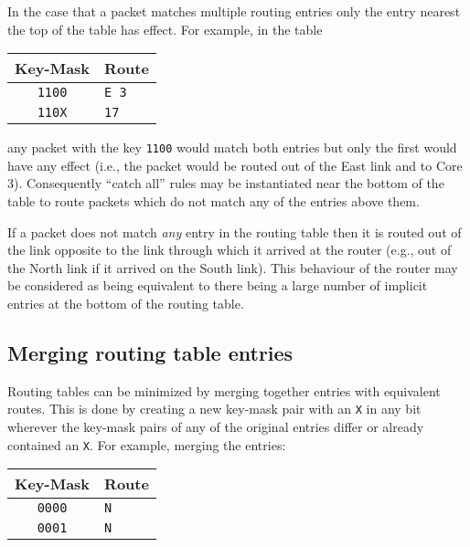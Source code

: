 \documentclass[conference]{IEEEtran}
\newcommand{\mytt}[1]{\texttt{\footnotesize#1}}
\begin{document}
  In the case that a packet matches multiple routing entries only the entry nearest the top of the table has effect.
  For example, in the table

  \begin{table}[H]
    \centering
    \begin{tabular}{c l}
      \toprule
      Key-Mask & Route \\
      \midrule
      \texttt{1100} & \texttt{E 3}\\
      \texttt{110X} & \texttt{17}\\
      \bottomrule
    \end{tabular}
  \end{table}

  \noindent any packet with the key \mytt{1100} would match both entries but only the first would have any effect (i.e., the packet would be routed out of the East link and to Core 3).
  Consequently ``catch all'' rules may be instantiated near the bottom of the table to route packets which do not match any of the entries above them.

  If a packet does not match \textit{any} entry in the routing table then it is routed out of the link opposite to the link through which it arrived at the router (e.g., out of the North link if it arrived on the South link).
  This behaviour of the router may be considered as being equivalent to there being a large number of implicit entries at the bottom of the routing table.

  \subsection{Merging routing table entries}

  Routing tables can be minimized by merging together entries with equivalent routes.
  This is done by creating a new key-mask pair with an \mytt{X} in any bit wherever the key-mask pairs of any of the original entries differ or already contained an \mytt{X}.
  For example, merging the entries:

  \begin{table}[H]
    \centering
    \begin{tabular}{c l}
      \toprule
      Key-Mask & Route \\
      \midrule
      \texttt{0000} & \texttt{N}\\
      \texttt{0001} & \texttt{N}\\
      \bottomrule
    \end{tabular}
  \end{table}
\end{document}
